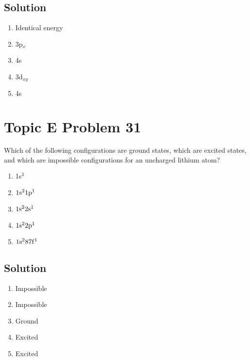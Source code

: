 \documentclass[10pt]{article}
\begin{document}
        \subsection{Solution}
            \begin{multicols}{3}
                \begin{enumerate}[label=\alph*/]
                    \item   Identical energy
                    \item   3p$_x$
                    \item   4s
                    \item   3d$_{xy}$
                    \item   4s
                \end{enumerate}
            \end{multicols}

    \pagebreak
    \section{Topic E Problem 31}
        Which of the following configurations are ground states, which are excited states, and which are impossible configurations for an uncharged lithium atom?
        \begin{multicols}{3}
            \begin{enumerate}[label=\alph*)]
                \item   1s$^3$
                \item   $\rm 1s^2 1p^1$
                \item   $\rm 1s^2 2s^1$
                \item   $\rm 1s^2 2p^1$
                \item   $\rm 1s^2 87f^1$
            \end{enumerate}
        \end{multicols}

        \subsection{Solution}
            \begin{multicols}{3}
                \begin{enumerate}[label=\alph*/]
                    \item   Impossible
                    \item   Impossible
                    \item   Ground
                    \item   Excited
                    \item   Excited
                \end{enumerate}
            \end{multicols}
\end{document}

